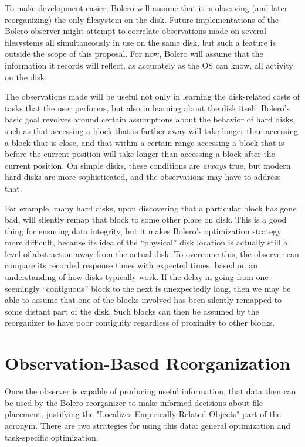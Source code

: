 \documentclass[10pt]{article}
\begin{document}
To make development easier, Bolero will assume that it is observing (and
later reorganizing) the only filesystem on the disk. Future implementations of the
Bolero observer might attempt to correlate observations
made on several filesystems all simultaneously in use on the same disk, but
such a feature is outside the scope of this proposal. For now, Bolero will assume that
the information it records will reflect, as accurately as the OS can know,
all activity on the disk.

The observations made will be useful not only in learning the disk-related costs of tasks
that the user performs, but also in learning about the disk itself. Bolero's basic goal revolves
around certain assumptions about the behavior of hard disks, such as that accessing
a block that is farther away will take longer than accessing a block that is close, and
that within a certain range accessing a block that is before the current position will take longer than
accessing a block after the current position. On simple disks, these conditions are
\emph{always} true, but modern hard disks are more sophisticated, and the observations
may have to address that.

For example, many hard disks, upon discovering that a particular block has gone bad, will silently
remap that block to some other place on disk\cite{remapping}. This is a good thing for ensuring
data integrity, but it makes Bolero's optimization strategy more difficult, because
its idea of the ``physical'' disk location is actually still a level of abstraction away from
the actual disk. To overcome this, the observer can compare its recorded response
times with expected times, based on an understanding of how disks typically work.
If the delay in going from one seemingly ``contiguous'' block to the next
is unexpectedly long, then we may be able to assume that one of the blocks involved
has been silently remapped to some distant part of the disk. Such blocks can then be
assumed by the reorganizer to have poor contiguity regardless of proximity to other
blocks.

\section{Observation-Based Reorganization}

Once the observer is capable of producing useful information, that data then can be used
by the Bolero reorganizer to make informed decisions about file placement, justifying the
"Localizes Empirically-Related Objects" part of the acronym. There are two
strategies for using this data: general optimization and task-specific optimization.
\end{document}
